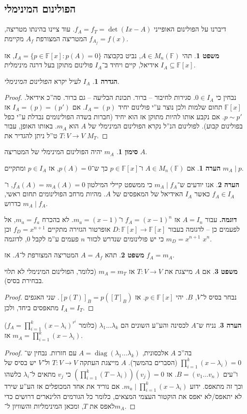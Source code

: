 \documentclass[a4paper]{article}
\DeclareMathOperator{\diag}    {diag}
\newcommand\F         {\mathbb{F}}
\newcommand\co        {\colon}
\renewcommand\lg      {\lambda}
\newcommand\cl [1]    {\left ( #1 \right )}
\theoremstyle{definition}
\newtheorem{Theorem}{\color{myblue}משפט}
\newtheorem{Definition}{\color{mygreen}הגדרה}
\newtheorem{Remark}{\color{mycyan}הערה}
\newtheorem{Notion}{\color{myred}סימון}
\newcommand\theo  [1] {\begin{Theorem}#1\end{Theorem}}
\newcommand\defi  [1] {\begin{Definition}#1\end{Definition}}
\newcommand\rmark [1] {\begin{Remark}#1\end{Remark}}
\newcommand\noti  [1] {\begin{Notion}#1\end{Notion}}
\begin{document}
	\subsection{הפולינום המינימלי}
	
	דיברנו על הפולינום האופייני $f_A = f_T = \det(Ix - A)$. עוד ציינו בהינתו מטריצה, המטריצה המצורפת $A_f$ מקיימת $f_{A_f} = f(x)$. 
	
	
	\theo{תהי $A \in M_n(\F)$, נביט בקבוצה $I_A = \{p \in \F[x] \co p(A) = 0\}$, אז $I_A \subseteq \F[x]$ אידיאל, קיים ויחיד ב־$I_A$ פולינום מתוקן בעל דרגה מינימלית. }
	\defi{$I_A$ לעיל יקרא \textit{הפולינום המינימלי}. }
	\begin{proof}
		נבחין כי $0 \in I_A$. סגירות לחיבור – ברור. תכונת הבליעה – גם ברור. סה''כ אידיאל. 
		$\F[x]$ תחום שלמות ולכן נוצר ע''י פולינום יחיד $I_A = (p)$. אם $I_A = (p) = (p')$ אז $p \sim p'$. אם נקבע אותו להיות מתוקן אז הוא יחיד (חברות בשדה הפולינומים נבדלת ע''י כפל בפולינום קבוע).  לפולינום הנ''ל נקרא הפולינום המינימלי של $A$ הוא $m_A$. באותו האופן, עבור $T \co V \to V$ ט''ל ניתן להגדיר את $M_T$. 
	\end{proof}
	
	\noti{$m_A$ יהיה הפולינום המינימלי של המטריצה $A$. }
	
	\rmark{אם $A \in M_n(\F)$ ו־$p \in \F[x]$ כך ש־$p(A) = 0$, אז $p \in I_A$ ומתקיים $m_A \mid p$. }
	
	\rmark{אנו יודעים ש־$m_A \mid f_A$ כי ממשפט קיילי המילטון $f_A(A) = m_A(A) = 0$, ו־$f_A \in I_A$ כאשר $I_A$ האידיאל של המאפסים של $A$. מהיות מרחב הפולינומים תחום ראשי, $m_A \mid f_A$ כדרוש. }
	
	\textbf{דוגמה. }עבור $A = I_n$ אז $f_A = (x - 1)^{n}$ ו־$m_a = (x - 1)$. לא בהכרח $m_a = f_a$, אל לפעמים כן – לדגומה בעבור $D \co \F[x] \to \F[x]$ אופרטור הגזירה מתקיים $f_D = x^{n + 1}$ וכן $m_D = x^{n + 1}$ כי יש פולינומים שנדרש לכזור $n$ פעמים ע''מ לקבל $0$, לדוגמה $x^{n}$. 
	
	\theo{תהא $A =A_f$ המטריצה המצורפת ל־$A$. אז $f_A = m_A$.}
	\theo{אם $A$ מייצגת את $T \co V \to V$ אז $m_A = m_T$ (כלומר, הפולינום המינימלי לא תלוי בבחירת בסיס).}
	\begin{proof}
		נבחר בסיס ל־$V$, $B$. יהי $p \in \F[x]$. אז $[p(T)]_B = p([T]_B)$. שני האגפים מתאפסים ביחד, ולכן $I_A = I_T$. 
	\end{proof}
	\rmark{נניח ש־$A$ לכסינה והע''ע השונים הם $\lg_1 \dots \lg_k$ (כלומר $f_A = \prod_{i = 1}^{k}(x - \lg_i)^{r^i}$) אז $m_A = \prod_{i = 1}^{k}(x - \lg_i)$. }
	
	\begin{proof}
		בה''כ $A$ אלכסונית, $A = \diag(\lg_1 \dots \lg_k)$ עם חזרות. נבחין ש־$\prod_{i = 1}^{k} (x - \lg_i) = 0$ (הסברים בהמשך). $A$ מייצגת העתקה $T \co V \to V$ ול־$V$ יש בסיס של ו''עים $B = (v_1 \dots v_n)$.  אז $\cl{\prod_{i = 1}^{k}(T - \lg_i)}(v_j) = 0$ כי $v_j$ מתאים ל־$\lg_i$ כלשהו וכך זה מתאפס. ידוע $m_a \mid \prod_{i = 1}^{k}(x - \lg_i)$. אם נוריד את אחד המכופלים אז הע''ע שירד לא יתאפס/לא יאפס את הוקטור העצמי המצאים, כלומר כל הגורמים הלינארים דרושים כדי לאפס את $T$, ומכאן המינימליות והשוויון ל־$m_A$. 
	\end{proof}
	
\end{document}
